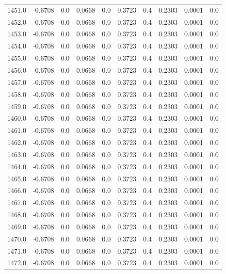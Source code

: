\begin{longtable}{lrrrrrrrrr}
1451.0 & -0.6708 & 0.0 & 0.0668 & 0.0 & 0.3723 & 0.4 & 0.2303 & 0.0001 & 0.0 \\
1452.0 & -0.6708 & 0.0 & 0.0668 & 0.0 & 0.3723 & 0.4 & 0.2303 & 0.0001 & 0.0 \\
1453.0 & -0.6708 & 0.0 & 0.0668 & 0.0 & 0.3723 & 0.4 & 0.2303 & 0.0001 & 0.0 \\
1454.0 & -0.6708 & 0.0 & 0.0668 & 0.0 & 0.3723 & 0.4 & 0.2303 & 0.0001 & 0.0 \\
1455.0 & -0.6708 & 0.0 & 0.0668 & 0.0 & 0.3723 & 0.4 & 0.2303 & 0.0001 & 0.0 \\
1456.0 & -0.6708 & 0.0 & 0.0668 & 0.0 & 0.3723 & 0.4 & 0.2303 & 0.0001 & 0.0 \\
1457.0 & -0.6708 & 0.0 & 0.0668 & 0.0 & 0.3723 & 0.4 & 0.2303 & 0.0001 & 0.0 \\
1458.0 & -0.6708 & 0.0 & 0.0668 & 0.0 & 0.3723 & 0.4 & 0.2303 & 0.0001 & 0.0 \\
1459.0 & -0.6708 & 0.0 & 0.0668 & 0.0 & 0.3723 & 0.4 & 0.2303 & 0.0001 & 0.0 \\
1460.0 & -0.6708 & 0.0 & 0.0668 & 0.0 & 0.3723 & 0.4 & 0.2303 & 0.0001 & 0.0 \\
1461.0 & -0.6708 & 0.0 & 0.0668 & 0.0 & 0.3723 & 0.4 & 0.2303 & 0.0001 & 0.0 \\
1462.0 & -0.6708 & 0.0 & 0.0668 & 0.0 & 0.3723 & 0.4 & 0.2303 & 0.0001 & 0.0 \\
1463.0 & -0.6708 & 0.0 & 0.0668 & 0.0 & 0.3723 & 0.4 & 0.2303 & 0.0001 & 0.0 \\
1464.0 & -0.6708 & 0.0 & 0.0668 & 0.0 & 0.3723 & 0.4 & 0.2303 & 0.0001 & 0.0 \\
1465.0 & -0.6708 & 0.0 & 0.0668 & 0.0 & 0.3723 & 0.4 & 0.2303 & 0.0001 & 0.0 \\
1466.0 & -0.6708 & 0.0 & 0.0668 & 0.0 & 0.3723 & 0.4 & 0.2303 & 0.0001 & 0.0 \\
1467.0 & -0.6708 & 0.0 & 0.0668 & 0.0 & 0.3723 & 0.4 & 0.2303 & 0.0001 & 0.0 \\
1468.0 & -0.6708 & 0.0 & 0.0668 & 0.0 & 0.3723 & 0.4 & 0.2303 & 0.0001 & 0.0 \\
1469.0 & -0.6708 & 0.0 & 0.0668 & 0.0 & 0.3723 & 0.4 & 0.2303 & 0.0001 & 0.0 \\
1470.0 & -0.6708 & 0.0 & 0.0668 & 0.0 & 0.3723 & 0.4 & 0.2303 & 0.0001 & 0.0 \\
1471.0 & -0.6708 & 0.0 & 0.0668 & 0.0 & 0.3723 & 0.4 & 0.2303 & 0.0001 & 0.0 \\
1472.0 & -0.6708 & 0.0 & 0.0668 & 0.0 & 0.3723 & 0.4 & 0.2303 & 0.0001 & 0.0 \\

\end{longtable}
